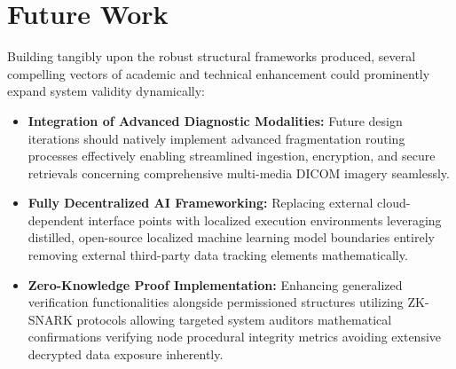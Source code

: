 \section{Future Work}
Building tangibly upon the robust structural frameworks produced, several compelling vectors of academic and technical enhancement could prominently expand system validity dynamically:
\begin{itemize}
    \item \textbf{Integration of Advanced Diagnostic Modalities:} Future design iterations should natively implement advanced fragmentation routing processes effectively enabling streamlined ingestion, encryption, and secure retrievals concerning comprehensive multi-media DICOM imagery seamlessly.
    \item \textbf{Fully Decentralized AI Frameworking:} Replacing external cloud-dependent interface points with localized execution environments leveraging distilled, open-source localized machine learning model boundaries entirely removing external third-party data tracking elements mathematically.
    \item \textbf{Zero-Knowledge Proof Implementation:} Enhancing generalized verification functionalities alongside permissioned structures utilizing ZK-SNARK protocols allowing targeted system auditors mathematical confirmations verifying node procedural integrity metrics avoiding extensive decrypted data exposure inherently.
\end{itemize} 
